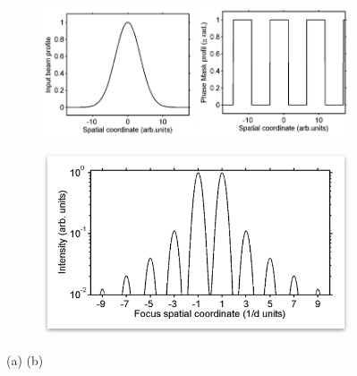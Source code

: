 \begin{figure}
	\centering
	\begin{subfigure}[b]{0.45\textwidth}
		\caption{}
		\includegraphics[width=\textwidth]{figures/Two_source/spatial_profile}
		\label{fig:spatial_profile}
	\end{subfigure}
	\begin{subfigure}[b]{0.45\textwidth}
		\caption{}
		\includegraphics[width=\textwidth]{figures/Two_source/focus_profile}
		\label{fig:focus_profile}
	\end{subfigure}
	\caption{(a) (b)}
\end{figure}


